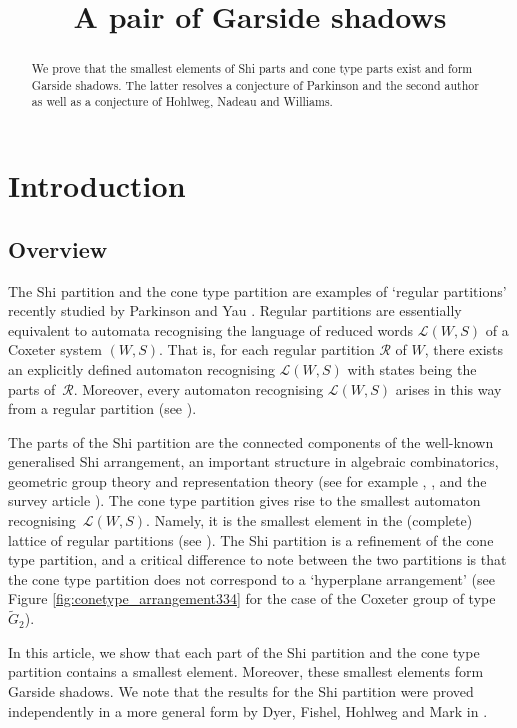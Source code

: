\documentclass[Unicode,ALCO]{cedram}
\title{A pair of Garside shadows}
\author[\initial{P.} Przytycki]{\firstname{Piotr} \lastname{Przytyck}}
\author{\firstname{Yeeka}  \lastname{Yau}}
\begin{document}
\begin{abstract}
  We prove that the smallest elements of Shi parts and cone type parts exist and form Garside shadows. The latter resolves a conjecture of Parkinson and the second author as well as a conjecture of Hohlweg, Nadeau and Williams.
\end{abstract}

\maketitle

\section{Introduction}

\subsection*{Overview}
The Shi partition and the cone type partition are examples of `regular partitions' recently studied by Parkinson and Yau \cite{Parkinson-Yau_2022}. Regular partitions are essentially equivalent to automata recognising the language of reduced words $\mathcal{L}(W,S)$ of a Coxeter system $(W,S)$. That is, for each regular partition $\mathscr{R}$ of $W$, there exists an explicitly defined automaton recognising $\mathcal{L}(W,S)$ with states being the parts of~$\mathscr{R}$. Moreover, every automaton recognising $\mathcal{L}(W,S)$ arises in this way from a regular partition (see \cite[Thm.~2]{Parkinson-Yau_2022}).

The parts of the Shi partition are the connected components of the well-known generalised Shi arrangement, an important structure in algebraic combinatorics, geometric group theory and representation theory (see for example \cite{DH}, \cite{DHFM}, and the survey article \cite{MR3969572}). The cone type partition gives rise to the smallest automaton recognising~$\mathcal{L}(W,S)$. Namely, it is the smallest element in the (complete) lattice of regular partitions (see \cite[Thm.~3 and Cor.~4]{Parkinson-Yau_2022}). The Shi partition is a refinement of the cone type partition, and a critical difference to note between the two partitions is that the cone type partition does not correspond to a `hyperplane arrangement' (see Figure \ref{fig:conetype_arrangement334} for the case of the Coxeter group of type $\widetilde{G}_2$).

In this article, we show that each part of the Shi partition and the cone type partition contains a smallest element. Moreover, these smallest elements form Garside shadows. We note that the results for the Shi partition were proved independently in a more general form by Dyer, Fishel, Hohlweg and Mark in \cite[Thm.~1.1(1)]{DHFM}.
\end{document}
